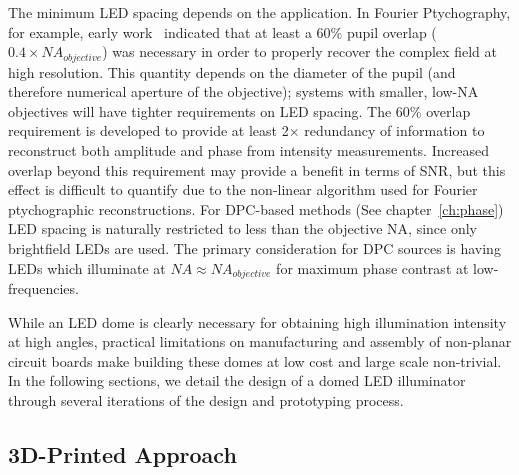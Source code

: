 The minimum LED spacing depends on the application. In Fourier Ptychography, for example, early work~\cite{Zheng2013, Tian14, Guo:15} indicated that at least a 60\% pupil overlap ($0.4 \times NA_{objective}$) was necessary in order to properly recover the complex field at high resolution. This quantity depends on the diameter of the pupil (and therefore numerical aperture of the objective); systems with smaller, low-NA objectives will have tighter requirements on LED spacing. The 60\% overlap requirement is developed to provide at least 2$\times$ redundancy of information to reconstruct both amplitude and phase from intensity measurements. Increased overlap beyond this requirement may provide a benefit in terms of SNR, but this effect is difficult to quantify due to the non-linear algorithm used for Fourier ptychographic reconstructions. For DPC-based methods (See chapter~\ref{ch:phase}) LED spacing is naturally restricted to less than the objective NA, since only brightfield LEDs are used. The primary consideration for DPC sources is having LEDs which illuminate at $NA \approx NA_{objective}$ for maximum phase contrast at low-frequencies.

While an LED dome is clearly necessary for obtaining high illumination intensity at high angles, practical limitations on manufacturing and assembly of non-planar circuit boards make building these domes at low cost and large scale non-trivial. In the following sections, we detail the design of a domed LED illuminator through several iterations of the design and prototyping process.

\subsection{3D-Printed Approach}\label{sec:fabrication:ccsdome}

